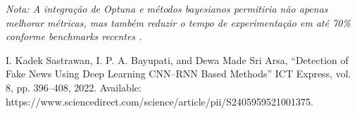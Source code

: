 \documentclass[conference]{IEEEtran}
\begin{document}
\vspace{0.2cm}
\noindent \footnotesize{\textit{Nota: A integração de Optuna e métodos bayesianos permitiria não apenas melhorar métricas, mas também reduzir o tempo de experimentação em até 70\% conforme benchmarks recentes \cite{optuna_benchmark}.}}

\newpage

\begin{thebibliography}{00}
 I. Kadek Sastrawan, I. P. A. Bayupati, and Dewa Made Sri Arsa, ``Detection of Fake News Using Deep Learning CNN--RNN Based Methods'' ICT Express, vol. 8, pp. 396--408, 2022. Available: https://www.sciencedirect.com/science/article/pii/S2405959521001375.

\end{thebibliography}

\vspace{12pt}
\end{document}
